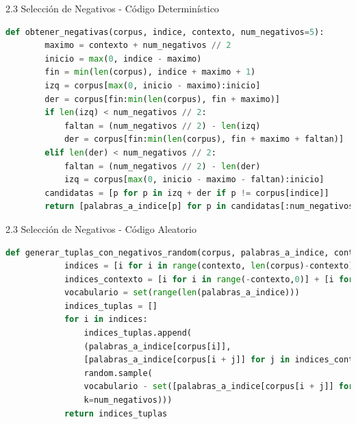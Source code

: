 \documentclass{beamer}
\begin{document}
\begin{frame}[fragile]{2.3 Selección de Negativos - Código Determinístico}
	\begin{block}{}
		\begin{lstlisting}[language=Python]
def obtener_negativas(corpus, indice, contexto, num_negativos=5):
		maximo = contexto + num_negativos // 2
		inicio = max(0, indice - maximo)
		fin = min(len(corpus), indice + maximo + 1)
		izq = corpus[max(0, inicio - maximo):inicio]
		der = corpus[fin:min(len(corpus), fin + maximo)]
		if len(izq) < num_negativos // 2:
			faltan = (num_negativos // 2) - len(izq)
			der = corpus[fin:min(len(corpus), fin + maximo + faltan)]
		elif len(der) < num_negativos // 2:
			faltan = (num_negativos // 2) - len(der)
			izq = corpus[max(0, inicio - maximo - faltan):inicio]
		candidatas = [p for p in izq + der if p != corpus[indice]]
		return [palabras_a_indice[p] for p in candidatas[:num_negativos]]
		\end{lstlisting}
	\end{block}
\end{frame}

\begin{frame}[fragile]{2.3 Selección de Negativos - Código Aleatorio}
	\begin{block}{}
		\begin{lstlisting}[language=Python]
def generar_tuplas_con_negativos_random(corpus, palabras_a_indice, contexto, num_negativos):
			indices = [i for i in range(contexto, len(corpus)-contexto)]
			indices_contexto = [i for i in range(-contexto,0)] + [i for i in range(1,contexto+1)]
			vocabulario = set(range(len(palabras_a_indice)))
			indices_tuplas = []
			for i in indices:
				indices_tuplas.append(
				(palabras_a_indice[corpus[i]],
				[palabras_a_indice[corpus[i + j]] for j in indices_contexto],
				random.sample(
				vocabulario - set([palabras_a_indice[corpus[i + j]] for j in indices_contexto]),
				k=num_negativos)))
			return indices_tuplas
		\end{lstlisting}
	\end{block}
\end{frame}
\end{document}
